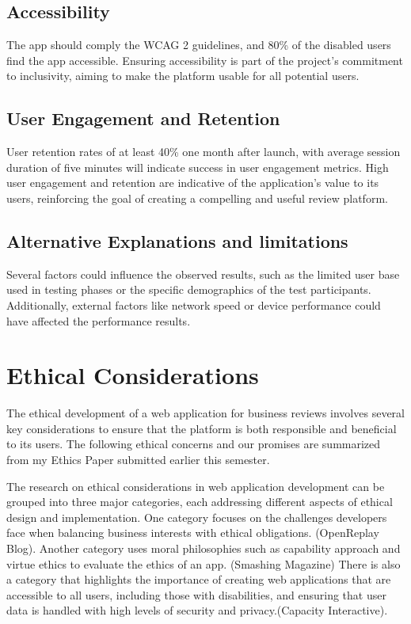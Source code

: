 \documentclass[10pt,twocolumn]{article}
\begin{document}
    \subsection{Accessibility}
    The app should comply the WCAG 2 guidelines, and 80\% of the disabled users find the app accessible. Ensuring accessibility is part of the project’s commitment to inclusivity, aiming to make the platform usable for all potential users.


    \subsection{User Engagement and Retention}
    User retention rates of at least 40\% one month after launch, with average session duration of five minutes will indicate success in user engagement metrics. High user engagement and retention are indicative of the application’s value to its users, reinforcing the goal of creating a compelling and useful review platform.

    \subsection{Alternative Explanations and limitations}
    Several factors could influence the observed results, such as the limited user base used in testing phases or the specific demographics of the test participants. Additionally, external factors like network speed or device performance could have affected the performance results.


    \section{Ethical Considerations}

    The ethical development of a web application for business reviews involves several key considerations to ensure that the platform is both responsible and beneficial to its users. The following ethical concerns and our promises are summarized from my Ethics Paper submitted earlier this semester.

    The research on ethical considerations in web application development can be grouped into three major categories, each addressing different aspects of ethical design and implementation. One category focuses on the challenges developers face when balancing business interests with ethical obligations. (OpenReplay Blog). Another category uses moral philosophies such as capability approach and virtue ethics to evaluate the ethics of an app. (Smashing Magazine) There is also a category that highlights the importance of creating web applications that are accessible to all users, including those with disabilities, and ensuring that user data is handled with high levels of security and privacy.(Capacity Interactive).
\end{document}
